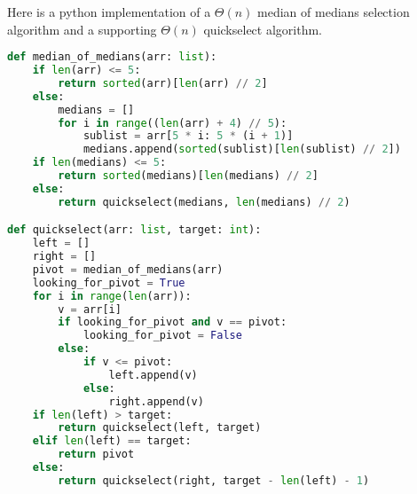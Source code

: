 \documentclass[10pt,\jkfside,a4paper]{article}
\begin{document}
\begin{enumerate}
Here is a python implementation of a $\Theta(n)$ median of medians selection algorithm and 
a supporting $\Theta(n)$ quickselect algorithm.

\begin{lstlisting}[language=python]
def median_of_medians(arr: list):
    if len(arr) <= 5:
        return sorted(arr)[len(arr) // 2]
    else:
        medians = []
        for i in range((len(arr) + 4) // 5):
            sublist = arr[5 * i: 5 * (i + 1)]
            medians.append(sorted(sublist)[len(sublist) // 2])
    if len(medians) <= 5:
        return sorted(medians)[len(medians) // 2]
    else:
        return quickselect(medians, len(medians) // 2)

def quickselect(arr: list, target: int):
    left = []
    right = []
    pivot = median_of_medians(arr)
    looking_for_pivot = True
    for i in range(len(arr)):
        v = arr[i]
        if looking_for_pivot and v == pivot:
            looking_for_pivot = False
        else:
            if v <= pivot:
                left.append(v)
            else:
                right.append(v)
    if len(left) > target:
        return quickselect(left, target)
    elif len(left) == target:
        return pivot
    else:
        return quickselect(right, target - len(left) - 1)
\end{lstlisting}

\end{enumerate}
\end{document}
